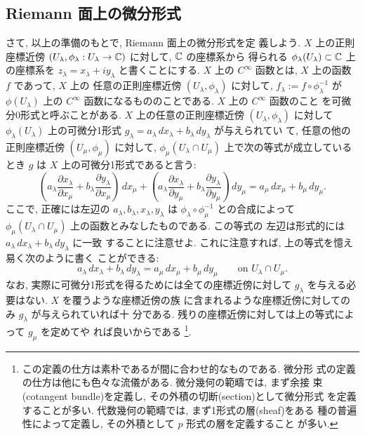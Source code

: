\documentclass[12pt,twoside]{jarticle}
\def\C{{\Bbb C}} %
\def\pd#1#2{\frac{\partial #1}{\partial #2}}
\begin{document}

\subsection{Riemann 面上の微分形式}

さて, 以上の準備のもとで, Riemann 面上の微分形式を定
義しよう. $X$ 上の正則座標近傍 %
$(U_\lambda,\phi_\lambda:U_\lambda\to\C)$ に対して, $\C$ の座標系から
得られる $\phi_\lambda(U_\lambda)\subset\C$ 上の座標系を %
$z_\lambda=x_\lambda+iy_\lambda$ と書くことにする. %
$X$ 上の $C^\infty$ 函数とは, $X$ 上の函数 $f$ であって, $X$ 上の
任意の正則座標近傍 $(U_\lambda,\phi_\lambda)$ に対して, %
$f_\lambda:=f\circ\phi_\lambda^{-1}$ が $\phi(U_\lambda)$ 上の 
$C^\infty$ 函数になるもののことである. $X$ 上の $C^\infty$ 函数のこと
を可微分0形式と呼ぶことがある. %
$X$ 上の任意の正則座標近傍 $(U_\lambda,\phi_\lambda)$ に対して %
$\phi_\lambda(U_\lambda)$ 上の可微分1形式 %
$g_\lambda=a_\lambda\,dx_\lambda+b_\lambda\,dy_\lambda$ が与えられてい
て, 任意の他の正則座標近傍 $(U_\mu,\phi_\mu)$ に対して, %
$\phi_\mu(U_\lambda\cap U_\mu)$ 上で次の等式が成立しているとき $g$ %
は $X$ 上の可微分1形式であると言う:
\[
  \left(
    a_\lambda \pd{x_\lambda}{x_\mu} +
    b_\lambda \pd{y_\lambda}{x_\mu}
  \right)
  \,dx_\mu +
  \left(
    a_\lambda \pd{x_\lambda}{y_\mu} +
    b_\lambda \pd{y_\lambda}{y_\mu}
  \right)
  \,dy_\mu
  = a_\mu\,dx_\mu+b_\mu\,dy_\mu.
\]
ここで, 正確には左辺の $a_\lambda,b_\lambda,x_\lambda,y_\lambda$ は %
$\phi_\lambda\circ\phi_\mu^{-1}$ との合成によって %
$\phi_\mu(U_\lambda\cap U_\mu)$ 上の函数とみなしたものである. この等式の
左辺は形式的には $a_\lambda\,dx_\lambda+b_\lambda\,dy_\lambda$ に一致
することに注意せよ. これに注意すれば, 上の等式を憶え易く次のように書く
ことができる:
\[
    a_\lambda\,dx_\lambda+b_\lambda\,dy_\lambda
  = a_\mu\,dx_\mu+b_\mu\,dy_\mu
  \qquad
  \text{on $U_\lambda\cap U_\mu$.}
\]
なお, 実際に可微分1形式を得るためには全ての座標近傍に対して %
$g_\lambda$ を与える必要はない. $X$ を覆うような座標近傍の族
に含まれるような座標近傍に対してのみ $g_\lambda$ が与えられていれば十
分である. 残りの座標近傍に対しては上の等式によって $g_\mu$ を定めてや
れば良いからである%
\footnote{この定義の仕方は素朴であるが間に合わせ的なものである. 微分形
  式の定義の仕方は他にも色々な流儀がある. 微分幾何の範疇では, まず余接
  束(cotangent bundle)を定義し, その外積の切断(section)として微分形式
  を定義することが多い. 代数幾何の範疇では, まず1形式の層(sheaf)をある
  種の普遍性によって定義し, その外積として $p$ 形式の層を定義すること
  が多い.}. %
\end{document}
